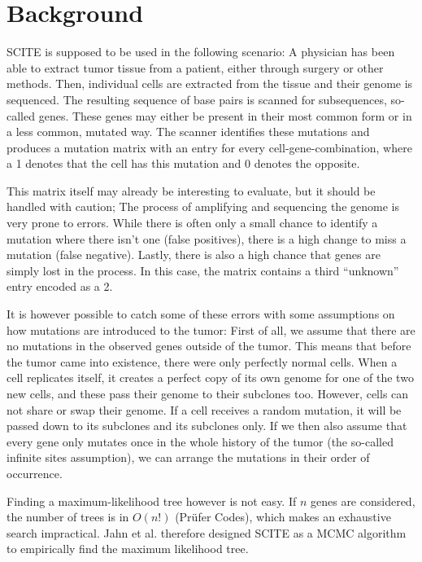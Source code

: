 \section{Background}

SCITE is supposed to be used in the following scenario: A physician has been able to extract tumor tissue from a patient, either through surgery or other methods. Then, individual cells are extracted from the tissue and their genome is sequenced. The resulting sequence of base pairs is scanned for subsequences, so-called genes. These genes may either be present in their most common form or in a less common, mutated way. The scanner identifies these mutations and produces a mutation matrix with an entry for every cell-gene-combination, where a 1 denotes that the cell has this mutation and 0 denotes the opposite.

This matrix itself may already be interesting to evaluate, but it should be handled with caution; The process of amplifying and sequencing the genome is very prone to errors. While there is often only a small chance to identify a mutation where there isn't one (false positives), there is a high change to miss a mutation (false negative). Lastly, there is also a high chance that genes are simply lost in the process. In this case, the matrix contains a third ``unknown'' entry encoded as a 2.


It is however possible to catch some of these errors with some assumptions on how mutations are introduced to the tumor: First of all, we assume that there are no mutations in the observed genes outside of the tumor. This means that before the tumor came into existence, there were only perfectly normal cells. When a cell replicates itself, it creates a perfect copy of its own genome for one of the two new cells, and these pass their genome to their subclones too. However, cells can not share or swap their genome. If a cell receives a random mutation, it will be passed down to its subclones and its subclones only. If we then also assume that every gene only mutates once in the whole history of the tumor (the so-called infinite sites assumption), we can arrange the mutations in their order of occurrence.


Finding a maximum-likelihood tree however is not easy. If $n$ genes are considered, the number of trees is in $O(n!)$ (Prüfer Codes), which makes an exhaustive search impractical. Jahn et al. therefore designed \ac{SCITE} as a \ac{MCMC} algorithm to empirically find the maximum likelihood tree.

